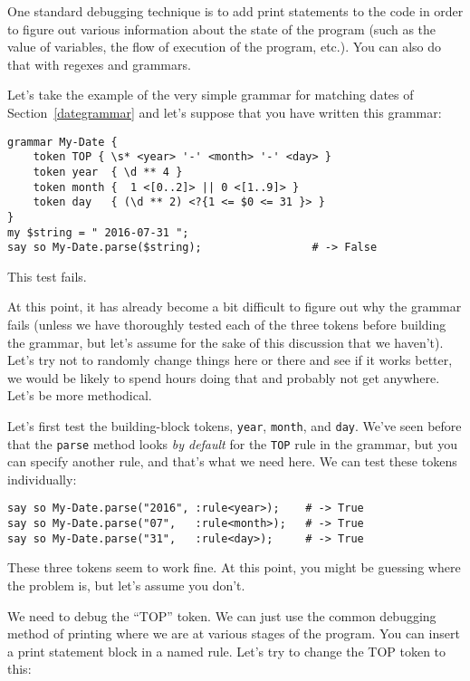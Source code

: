 One standard debugging technique is to add print statements 
to the code in order to figure out various information about 
the state of the program (such as the value of variables, the 
flow of execution of the program, etc.). You can also do that 
with regexes and grammars.

Let's take the example of the very simple grammar for 
matching dates of Section~\ref{dategrammar} and let's suppose 
that you have written this grammar:

\begin{verbatim}
grammar My-Date {
    token TOP { \s* <year> '-' <month> '-' <day> }
    token year  { \d ** 4 }                                        
    token month {  1 <[0..2]> || 0 <[1..9]> }                
    token day   { (\d ** 2) <?{1 <= $0 <= 31 }> }  
}                         
my $string = " 2016-07-31 ";
say so My-Date.parse($string);                 # -> False
\end{verbatim}

This test fails.

At this point, it has already become a bit difficult to figure 
out why the grammar fails (unless we have thoroughly tested 
each of the three tokens before building the grammar, but 
let's assume for the sake of this discussion that we haven't).
Let's try not to randomly change things here or there and see 
if it works better, we would be likely to spend hours doing 
that and probably not get anywhere. Let's be more methodical.

Let's first test the building-block tokens, {\tt year}, 
{\tt month}, and {\tt day}. We've seen before that 
the {\tt parse} method looks \emph{by default} for the {\tt TOP} 
rule in the grammar, but you can specify another rule, and 
that's what we need here. We can test these tokens individually:

\begin{verbatim}
say so My-Date.parse("2016", :rule<year>);    # -> True
say so My-Date.parse("07",   :rule<month>);   # -> True
say so My-Date.parse("31",   :rule<day>);     # -> True
\end{verbatim}

These three tokens seem to work fine. At this point, you 
might be guessing where the problem is, but let's assume 
you don't.

We need to debug the ``TOP'' token. We can just use the common 
debugging method of printing where we are at various stages 
of the program. You can insert a print statement block 
in a named rule. Let's try to change the TOP token to this:

